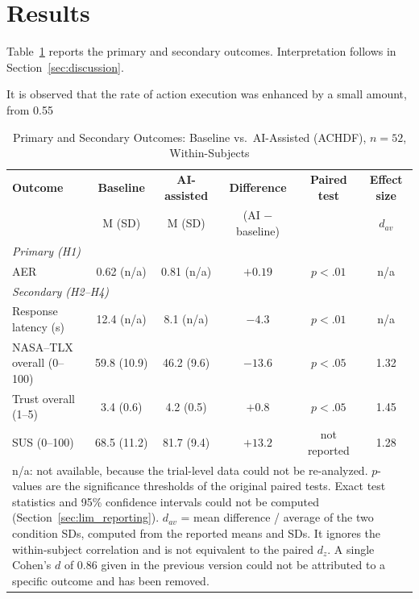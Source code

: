 \documentclass[journal]{IEEEtran}
\theoremstyle{plain}
\theoremstyle{definition}
\providecommand{\DIFaddtex}[1]{{\protect\color{blue} \sf #1}} %
\providecommand{\DIFdeltex}[1]{{\protect\color{red} \scriptsize #1}} %
\providecommand{\DIFaddbegin}{} %
\providecommand{\DIFaddend}{} %
\providecommand{\DIFdelbegin}{} %
\providecommand{\DIFdelend}{} %
\providecommand{\DIFadd}[1]{\texorpdfstring{\DIFaddtex{#1}}{#1}} %
\providecommand{\DIFdel}[1]{\texorpdfstring{\DIFdeltex{#1}}{}} %
\newcommand{\DIFscaledelfig}{0.5}
\newlength{\DIFdelgraphicswidth} %
\newlength{\DIFdelgraphicsheight} %
\newcommand{\DIFaddincludegraphics}[2][]{{\color{blue}\fbox{\DIFOincludegraphics[#1]{#2}}}} %
\newcommand{\DIFdelincludegraphics}[2][]{%
\sbox{\DIFdelgraphicsbox}{\DIFOincludegraphics[#1]{#2}}%
\settoboxwidth{\DIFdelgraphicswidth}{\DIFdelgraphicsbox} %
\settoboxtotalheight{\DIFdelgraphicsheight}{\DIFdelgraphicsbox} %
\scalebox{\DIFscaledelfig}{%
\parbox[b]{\DIFdelgraphicswidth}{\usebox{\DIFdelgraphicsbox}\\[-\baselineskip] \rule{\DIFdelgraphicswidth}{0em}}\llap{\resizebox{\DIFdelgraphicswidth}{\DIFdelgraphicsheight}{%
\setlength{\unitlength}{\DIFdelgraphicswidth}%
\begin{picture}(1,1)%
\thicklines\linethickness{2pt} %
{\color[rgb]{1,0,0}\put(0,0){\framebox(1,1){}}}%
{\color[rgb]{1,0,0}\put(0,0){\line( 1,1){1}}}%
{\color[rgb]{1,0,0}\put(0,1){\line(1,-1){1}}}%
\end{picture}%
}\hspace*{3pt}}} %
} %
\DeclareRobustCommand{\DIFaddbegin}{\DIFOaddbegin \let\includegraphics\DIFaddincludegraphics} %
\DeclareRobustCommand{\DIFaddend}{\DIFOaddend \let\includegraphics\DIFOincludegraphics} %
\DeclareRobustCommand{\DIFdelbegin}{\DIFOdelbegin \let\includegraphics\DIFdelincludegraphics} %
\DeclareRobustCommand{\DIFdelend}{\DIFOaddend \let\includegraphics\DIFOincludegraphics} %
\begin{document}
    \section{\DIFadd{Results}}
    \DIFadd{Table~\ref{tab:primary} reports the primary and secondary outcomes. Interpretation follows in Section~\ref{sec:discussion}}\DIFaddend .

    \DIFdelbegin \DIFdel{It is observed that the rate of action execution was enhanced by a small amount, from 0.55 }\DIFdelend \DIFaddbegin \begin{table}[t]
        \caption{Primary and Secondary Outcomes: Baseline vs.\ AI-Assisted (ACHDF), $n=52$, Within-Subjects}
        \label{tab:primary}
        \centering
        \begin{tabular}{l c c c c c}
            \toprule
            \textbf{Outcome} & \textbf{Baseline} & \textbf{AI-assisted} & \textbf{Difference} & \textbf{Paired test} & \textbf{Effect size} \\
            & M (SD) & M (SD) & (AI $-$ baseline) & & $d_{av}$ \\
            \midrule
            \multicolumn{6}{l}{\emph{Primary (H1)}} \\
            AER & 0.62 (n/a) & 0.81 (n/a) & $+0.19$ & $p < .01$ & n/a \\
            \midrule
            \multicolumn{6}{l}{\emph{Secondary (H2--H4)}} \\
            Response latency (s) & 12.4 (n/a) & 8.1 (n/a) & $-4.3$ & $p < .01$ & n/a \\
            NASA--TLX overall (0--100) & 59.8 (10.9) & 46.2 (9.6) & $-13.6$ & $p < .05$ & 1.32 \\
            Trust overall (1--5) & 3.4 (0.6) & 4.2 (0.5) & $+0.8$ & $p < .05$ & 1.45 \\
            SUS (0--100) & 68.5 (11.2) & 81.7 (9.4) & $+13.2$ & not reported & 1.28 \\
            \bottomrule
            \multicolumn{6}{p{0.92\linewidth}}{\footnotesize n/a: not available, because the trial-level data could not be re-analyzed. $p$-values are the significance thresholds of the original paired tests. Exact test statistics and 95\% confidence intervals could not be computed (Section~\ref{sec:lim_reporting}). $d_{av}$ = mean difference / average of the two condition SDs, computed from the reported means and SDs. It ignores the within-subject correlation and is not equivalent to the paired $d_z$. A single Cohen's $d$ of 0.86 given in the previous version could not be attributed to a specific outcome and has been removed.}
        \end{tabular}
    \end{table}
\end{document}
